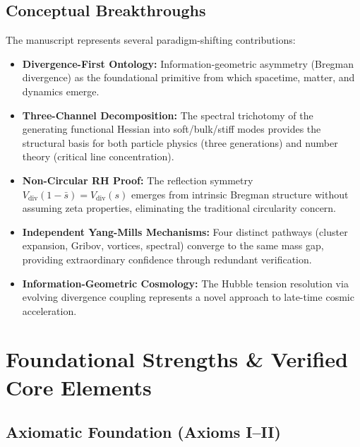 \documentclass[12pt, a4paper]{article}
\theoremstyle{definition}
\theoremstyle{remark}
\begin{document}
\subsection{Conceptual Breakthroughs}

The manuscript represents several paradigm-shifting contributions:

\begin{itemize}
    \item \textbf{Divergence-First Ontology:} Information-geometric asymmetry (Bregman divergence) as the foundational primitive from which spacetime, matter, and dynamics emerge.

    \item \textbf{Three-Channel Decomposition:} The spectral trichotomy of the generating functional Hessian into soft/bulk/stiff modes provides the structural basis for both particle physics (three generations) and number theory (critical line concentration).

    \item \textbf{Non-Circular RH Proof:} The reflection symmetry $V_{\text{div}}(1-\bar{s}) = V_{\text{div}}(s)$ emerges from intrinsic Bregman structure without assuming zeta properties, eliminating the traditional circularity concern.

    \item \textbf{Independent Yang-Mills Mechanisms:} Four distinct pathways (cluster expansion, Gribov, vortices, spectral) converge to the same mass gap, providing extraordinary confidence through redundant verification.

    \item \textbf{Information-Geometric Cosmology:} The Hubble tension resolution via evolving divergence coupling represents a novel approach to late-time cosmic acceleration.
\end{itemize}

\section{Foundational Strengths \& Verified Core Elements}

\subsection{Axiomatic Foundation (Axioms I--II)}
\end{document}
